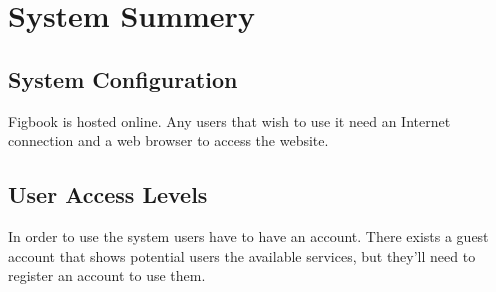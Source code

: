 \section{System Summery}

\subsection{System Configuration}
\par{Figbook is hosted online. Any users that wish to use it need an Internet connection and a web browser to access the website.}

\subsection{User Access Levels}
In order to use the system users have to have an account. There exists a guest account that shows potential users the available services, but they'll need to register an account to use them.
